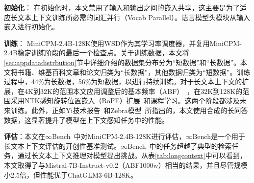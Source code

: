 \textbf{初始化}：
在初始化时，本文禁用了输入和输出之间的嵌入共享，这主要是为了适应长文本上下文训练所必需的词汇并行（Vocab Parallel）。语言模型头模块从输入嵌入进行初始化。

\textbf{训练}：
MiniCPM-2.4B-128K使用WSD作为其学习率调度器，并复用MiniCPM-2.4B稳定训练阶段的最后一个检查点。关于训练数据，本文将\ref{sec:appdatadistrbution}节中详细介绍的数据集分布分为“短数据”和“长数据”。本文将书籍、维基百科文章和论文归类为“长数据”，其他数据归类为“短数据”。训练过程中，44\%为长数据，56\%为短数据，以进行持续训练。对于长文本上下文的扩展，在4K到32K的范围本文应用调整后的基本频率（ABF）~\citep{xiong2023effective}，在32K到128K的范围采用NTK感知旋转位置嵌入（RoPE）扩展~\citep{bloc97_2023_ntk}和课程学习。这两个阶段都涉及未来训练。此外，正如Yi技术报告~\citep{young2024yi}和Zebra模型~\citep{song2023zebra}所指出的，本文使用合成的长问答数据，这显著提升了模型在上下文感知任务中的性能。

\textbf{评估}：本文在$\infty$Bench~\citep{zhang2024infty}中对MiniCPM-2.4B-128K进行评估，$\infty$Bench是一个用于长文本上下文评估的开创性基准测试。$\infty$Bench~\citep{zhang2024infty}中的任务超越了典型的检索任务，通过长文本上下文推理对模型提出挑战。从表\ref{tab:longcontext}中可以看到，本文取得了与Mistral-7B-Instruct-v0.2（ABF1000w）相当的结果，并且尽管规模小2.5倍，但性能优于ChatGLM3-6B-128K。 

